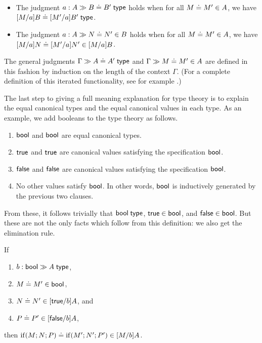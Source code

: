 \documentclass{article}
\begin{document}
\begin{definition}~
  \begin{itemize}
  \item The judgment $\hasTEC{a:A}{B}{B'}$ holds when for all
    $\hasEEC{M}{M'}{A}$, we have $\hasTEC{\subst{M}{a}{B}}{\subst{M'}{a}{B'}}$.
  \item The judgment $\hasEEC{a:A}{N}{N'}{B}$ holds when for all
    $\hasEEC{M}{M'}{A}$, we have
    $\hasEEC{\subst{M}{a}{N}}{\subst{M'}{a}{N'}}{\subst{M}{a}{B}}$.
  \end{itemize}
\end{definition}
The general judgments $\hasTEC{\Gamma}{A}{A'}$ and $\hasEEC{\Gamma}{M}{M'}{A}$
are defined in this fashion by induction on the length of the context
$\Gamma$. (For a complete definition of this iterated functionality, see for
example \cite{MartinLof:79}.)

The last step to giving a full meaning explanation for type theory is to explain
the equal canonical types and the equal canonical values in each type. As an
example, we add booleans to the type theory as follows.

\begin{enumerate}
\item $\mathsf{bool}$ and $\mathsf{bool}$ are equal canonical types.
\item $\mathsf{true}$ and $\mathsf{true}$ are canonical values satisfying the specification $\mathsf{bool}$.
\item $\mathsf{false}$ and $\mathsf{false}$ are canonical values satisfying the specification $\mathsf{bool}$.
\item No other values satisfy $\mathsf{bool}$. In other words, $\mathsf{bool}$ is inductively
  generated by the previous two clauses. 
\end{enumerate}

From these, it follows trivially that $\hasTC{\bool}$, $\hasEC{\true}{\bool}$,
and $\hasEC{\false}{\bool}$. But these are not the only facts which follow from
this definition: we also get the elimination rule.

\begin{theorem}
  If
  \begin{enumerate}
  \item $\hasTC{b:\bool}{A}$, 
  \item $\hasEEC{M}{M'}{\bool}$, 
  \item $\hasEEC{N}{N'}{\subst{\true}{b}{A}}$, and
  \item $\hasEEC{P}{P'}{\subst{\false}{b}{A}}$,
  \end{enumerate}
  then $\hasEEC{\ifexpr{M}{N}{P}}{\ifexpr{M'}{N'}{P'}}{\subst{M}{b}{A}}$.
\end{theorem}
\end{document}

